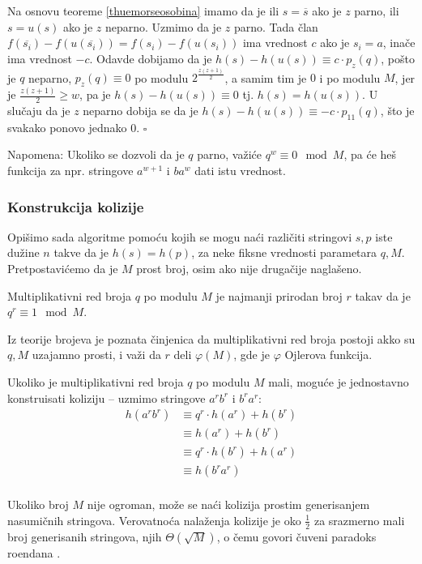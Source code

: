 Na osnovu teoreme \ref{thuemorseosobina} imamo da je ili $s = \overline{s}$ ako je $z$ parno, ili $s = u(s)$ ako je $z$ neparno. Uzmimo da je $z$ parno. Tada \v clan $f(\overline{s_i}) - f(u(\overline{s_i})) = f(s_i) - f(u(s_i))$ ima vrednost $c$ ako je $s_i = a$, ina\v ce ima vrednost $-c$.  Odavde dobijamo da je $h(s) - h(u(s)) \equiv c\cdot p_{z}(q)$, po\v sto je $q$ neparno, $p_{z}(q) \equiv 0$ po modulu $2^\frac{z(z+1)}{2}$, a samim tim je $0$ i po modulu $M$, jer je $\frac{z(z+1)}{2} \geq w$, pa je $h(s) - h(u(s)) \equiv 0$ tj. $h(s) = h(u(s))$. U slu\v caju da je $z$ neparno dobija se da je $h(s) - h(u(s)) \equiv -c\cdot p_{11}(q)$, \v sto je svakako ponovo jednako $0$. \hfill $\square$

Napomena: Ukoliko se dozvoli da je $q$ parno, va\v zi\' ce $q^w \equiv 0 \mod M$, pa \' ce he\v s funkcija za npr. stringove $a^{w+1}$ i $ba^{w}$ dati istu vrednost.

\subsubsection{Konstrukcija kolizije}

Opi\v simo sada algoritme pomo\' cu kojih se mogu na\' ci razli\v citi stringovi $s,p$ iste du\v zine $n$ takve da je $h(s) = h(p)$, za neke fiksne vrednosti parametara $q,M$. Pretpostavi\' cemo da je $M$ prost broj, osim ako nije druga\v cije nagla\v seno.

\begin{dfn}
Multiplikativni red broja $q$ po modulu $M$ je najmanji prirodan broj $r$ takav da je $q^r \equiv 1 \mod M$.
\end{dfn}

Iz teorije brojeva je poznata \v cinjenica da multiplikativni red broja postoji akko su $q,M$ uzajamno prosti, i va\v zi da $r$ deli $\varphi(M)$, gde je $\varphi$ Ojlerova funkcija.

Ukoliko je multiplikativni red broja $q$ po modulu $M$ mali, mogu\' ce je jednostavno konstruisati koliziju -- uzmimo stringove $a^rb^r$ i $b^ra^r$:
\begin{align*}
h(a^rb^r) & \equiv q^r \cdot h(a^r) + h(b^r) \\
          & \equiv h(a^r) + h(b^r) \\
          & \equiv q^r \cdot h(b^r) + h(a^r) \\
          & \equiv h(b^ra^r) \\
\end{align*}

Ukoliko broj $M$ nije ogroman, mo\v ze se na\' ci kolizija prostim generisanjem nasumi\v cnih stringova. Verovatno\' ca nala\v zenja kolizije je oko $\frac12$ za srazmerno mali broj generisanih stringova, njih $\Theta(\sqrt M)$, o \v cemu govori \v cuveni paradoks ro\dj endana \cite{birthdayrad}.

